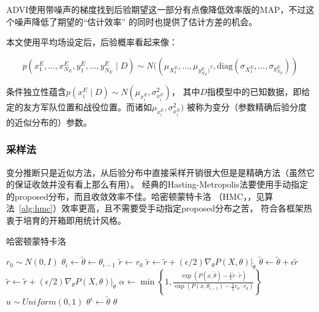 \documentclass{article}
\begin{document}
ADVI使用带噪声的梯度找到后验期望这一部分有点像降低效率版的MAP，不过这个噪声降低了期望的“估计效率”
的同时也提供了估计方差的机会。

本文使用平均场设定后，后验概率看起来像：

$$
p(x^E_1,\dots,x^E_{N_E},y^E_1,\dots,y^E_{N_E} \mid D) \sim 
N((\mu_{X^E_1},\dots,\mu_{y^E_{N_E})^T},\mathrm{diag}(\sigma_{X^E_1},\dots,\sigma_{y^E_{N_E}}))
$$


条件独立性蕴含$p(x^E_i \mid D) \sim N(\mu_{x^E_i},\sigma_{x^E_i}^2)$，
其中$D$指模型中的已知数据，即给定的友方军队位置和战役位置。而诸如$\mu_{x^E_i},\sigma_{x^E_i}^2)$
被称为变分（参数精确后验分度的近似分布的）参数。

\subsubsection{采样法}


变分推断只是近似方法，从后验分布中直接采样开销很大但是是精确方法（虽然它的保证收敛并没有看上那么有用）。
经典的Hasting-Metropolis法要使用手动指定的proposed分布，而且收敛效率不佳。哈密顿蒙特卡洛
（HMC，\cite{hoffman2014no}，见算法~\ref{alg:hmc}）效率更高，且不需要受手动指定proposed分布之苦，
符合各框架热衷于培育的开箱即用统计风格。

\begin{algorithm}
\caption{哈密顿蒙特卡洛}
\begin{algorithmic}[1]
 
        \State $r_0 \sim N(0,I)$
        \State $\theta_i \gets \tilde{\theta} \gets \theta_{i-1}$
        \State $\tilde{r} \gets r_0$
         
            \State $\tilde{r} \gets \tilde{r} + (\epsilon/2) \nabla_\theta P(X,\theta)|_{\tilde{\theta}}$
            \State $\tilde{\theta} \gets \tilde{\theta} + \epsilon \tilde{r}$
            \State $\tilde{r} \gets \tilde{r} + (\epsilon/2) \nabla_\theta P(X,\theta)|_{\tilde{\theta}}$
        \EndFor
        \State $\alpha \gets \min \left\{ 1, \frac{\exp(P(x,\tilde{\theta})-\frac{1}{2}\tilde{r}\cdot\tilde{r})}{\exp(P(x,\theta_{i-1})-\frac{1}{2}r_0\cdot r_0)} \right\}$
        \State $u \sim Uniform(0,1)$
            \State $\theta^i \gets \tilde{\theta}$
        \EndIf
    \EndFor
    \State \Return $\theta$
\EndProcedure
\end{algorithmic}
\label{alg:hmc}
\end{algorithm}
\end{document}
